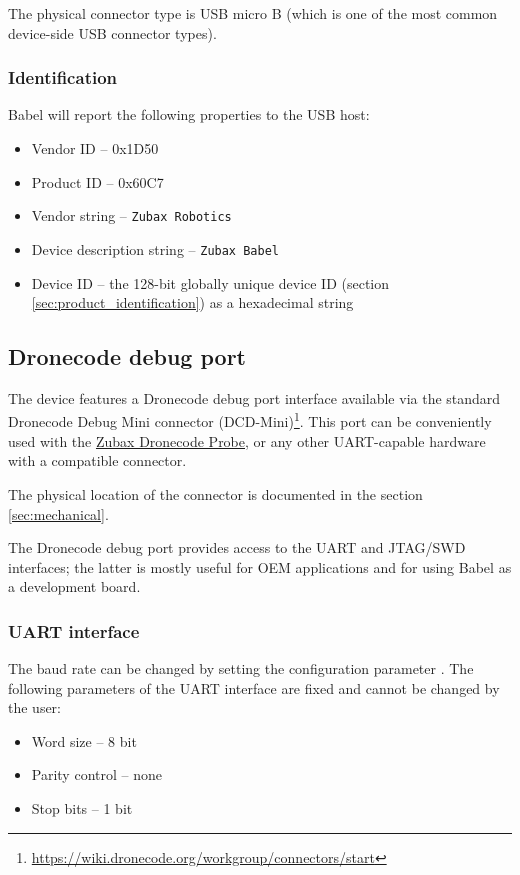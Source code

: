 \documentclass{zubaxdoc}
\begin{document}
The physical connector type is USB micro B (which is one of the most common device-side USB connector types).

\subsubsection{Identification}

Babel will report the following properties to the USB host:
\begin{itemize}
    \item Vendor ID -- 0x1D50
    \item Product ID -- 0x60C7
    \item Vendor string -- \verb|Zubax Robotics|
    \item Device description string -- \verb|Zubax Babel|
    \item Device ID -- the 128-bit globally unique device ID (section \ref{sec:product_identification})
                       as a hexadecimal string
\end{itemize}

\subsection{Dronecode debug port}\label{sec:dronecode_debug_port}

The device features a Dronecode debug port interface available via the standard
Dronecode Debug Mini connector (DCD-Mini)\footnote{\url{https://wiki.dronecode.org/workgroup/connectors/start}}.
This port can be conveniently used with the \href{https://kb.zubax.com/x/iIAh}{Zubax Dronecode Probe},
or any other UART-capable hardware with a compatible connector.

The physical location of the connector is documented in the section \ref{sec:mechanical}.

The Dronecode debug port provides access to the UART and JTAG/SWD interfaces;
the latter is mostly useful for OEM applications and for using Babel as a development board.

\subsubsection{UART interface}

The baud rate can be changed by setting the configuration parameter .
The following parameters of the UART interface are fixed and cannot be changed by the user:
\begin{itemize}
    \item Word size -- 8 bit
    \item Parity control -- none
    \item Stop bits -- 1 bit
\end{itemize}
\end{document}
